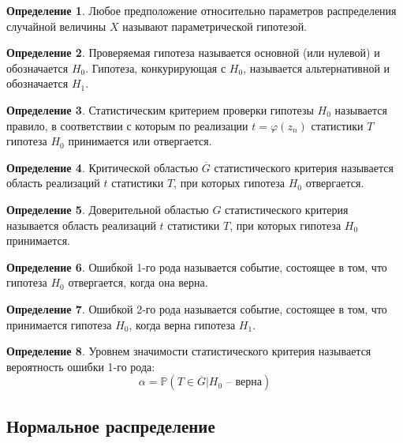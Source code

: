 \documentclass[12pt]{article}
\theoremstyle{definition}
\newtheorem{definition}{Определение}
\newcommand{\prob}{\mathbb{P}}
\begin{document}
\begin{definition}
    Любое предположение относительно параметров распределения случайной величины $X$ называют параметрической гипотезой.
\end{definition}
\begin{definition}
    Проверяемая гипотеза называется основной (или нулевой) и обозначается $H_0$. Гипотеза, конкурирующая с $H_0$, называется альтернативной и обозначается $H_1$.
\end{definition}
\begin{definition}
    Статистическим критерием проверки гипотезы $H_0$ называется правило, в соответствии с которым по реализации $t=\varphi(z_n)$ статистики $T$ гипотеза $H_0$ принимается или отвергается.
\end{definition}
\begin{definition}
    Критической областью $\overline{G}$ статистического критерия называется область реализаций $t$ статистики $T$, при которых гипотеза $H_0$ отвергается.
\end{definition}
\begin{definition}
    Доверительной областью $G$ статистического критерия называется область реализаций $t$ статистики $T$, при которых гипотеза $H_0$ принимается.
\end{definition}
\begin{definition}
    Ошибкой 1-го рода называется событие, состоящее в том, что гипотеза $H_0$ отвергается, когда она верна.
\end{definition}
\begin{definition}
    Ошибкой 2-го рода называется событие, состоящее в том, что принимается гипотеза $H_0$, когда верна гипотеза $H_1$.
\end{definition}
\begin{definition}
    Уровнем значимости статистического критерия называется вероятность ошибки 1-го рода:
    $$\alpha=\prob(T\in \overline{G}|H_0\text{ – верна})$$
\end{definition}

\subsection{Нормальное распределение}
\end{document}
